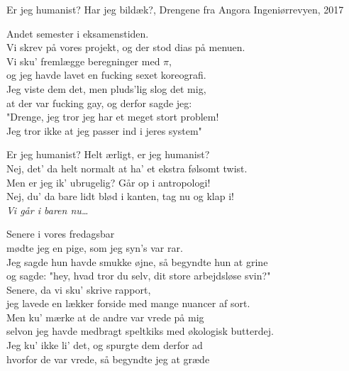\begin{song}{Er jeg humanist?}
  {} %
  {Har jeg bildæk?, Drengene fra Angora} %
  {} %
  {Ingeniørrevyen, 2017} %
  {\NotCCLIed} %

  \begin{SBVerse}
    Andet semester i eksamenstiden.\\
    Vi skrev på vores projekt, og der stod dias på menuen.\\
    Vi sku' fremlægge beregninger med $\pi$,\\
    og jeg havde lavet en fucking sexet koreografi.\\\medskip
    Jeg viste dem det, men pluds'lig slog det mig,\\
    at der var fucking gay, og derfor sagde jeg:\\
    "Drenge, jeg tror jeg har et meget stort problem!\\
    Jeg tror ikke at jeg passer ind i jeres system"
  \end{SBVerse}

  \begin{SBChorus}
    Er jeg humanist? Helt ærligt, er jeg humanist?\\
    Nej, det' da helt normalt at ha' et ekstra følsomt twist.\\
    Men er jeg ik' ubrugelig? Går op i antropologi!\\
    Nej, du' da bare lidt blød i kanten, tag nu og klap i!\\
    \emph{Vi går i baren nu\ldots}
  \end{SBChorus}

  \begin{SBVerse}
    Senere i vores fredagsbar\\
    mødte jeg en pige, som jeg syn's var rar.\\
    Jeg sagde hun havde smukke øjne, så begyndte hun at grine\\
    og sagde: "hey, hvad tror du selv, dit store arbejdsløse svin?"\\
    Senere, da vi sku' skrive rapport,\\
    jeg lavede en lækker forside med mange nuancer af sort.\\\medskip
    Men ku' mærke at de andre var vrede på mig\\
    selvon jeg havde medbragt speltkiks med økologisk butterdej.\\
    Jeg ku' ikke li' det, og spurgte dem derfor ad\\
    hvorfor de var vrede, så begyndte jeg at græde
  \end{SBVerse}


\end{song}
